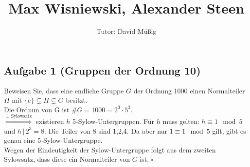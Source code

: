 \documentclass[11pt,a4paper,ngerman]{article}
\author{Tutor: David Müßig}
\date{}
\title{Max Wisniewski, Alexander Steen}
\begin{document}

\maketitle
\thispagestyle{fancy}


\subsection*{Aufgabe 1 \mdseries (Gruppen der Ordnung 10)}
Beweisen Sie, dass eine endliche Gruppe $G$ der Ordnung 1000 einen Normalteiler $H$
mit $\{e\} \subsetneq H \subsetneq G$ besitzt. \\

Die Ordnun von G ist $\#G = 1000 = 2^3 \cdot 5^3$. \\
$\stackrel{\text{1. Sylowsatz}}{\Rightarrow}$ existieren $h$ 5-Sylow-Untergruppen.  Für $h$ muss gelten: $h \equiv 1 \mod 5$ und $h \, | \, 2^3 = 8$. Die Teiler von 8 sind 1,2,4. Da aber nur $1 \equiv 1 \mod 5$ gilt, gibt es genau eine 5-Sylow-Untergruppe. \\
Wegen der Eindeutigkeit der Sylow-Untergruppe folgt aus dem zweiten Sylowsatz, dass diese ein Normalteiler von $G$ ist.
\mbox{} \hfill $\square$


\end{document}
